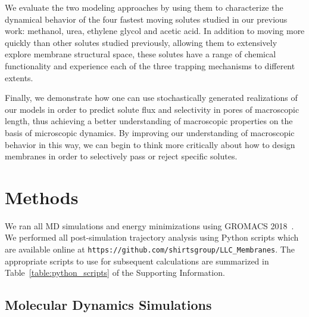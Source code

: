 \documentclass[journal=ancac3,manuscript=article,layout=twocolumn]{achemso}
\begin{document}
  We evaluate the two modeling approaches by using them to characterize the
  dynamical behavior of the four fastest moving solutes studied in our previous
  work: methanol, urea, ethylene glycol and acetic acid. In addition to moving
  more quickly than other solutes studied previously, allowing them to extensively
  explore membrane structural space, these solutes have a range of chemical 
  functionality and experience each of the three trapping mechanisms to different extents.
  
  
  Finally, we demonstrate how one can use stochastically generated realizations
  of our models in order to predict solute flux and selectivity in pores of 
  macroscopic length, thus achieving a better understanding of macroscopic 
  properties on the basis of microscopic dynamics. By improving our 
  understanding of macroscopic behavior in this way, we can begin to think more
  critically about how to design membranes in order to selectively pass or 
  reject specific solutes.
    
  \section{Methods}
    
  We ran all MD simulations and energy minimizations using GROMACS
  2018~\cite{bekker_gromacs:_1993,berendsen_gromacs:_1995,van_der_spoel_gromacs:_2005,hess_gromacs_2008}.
  We performed all post-simulation trajectory analysis using Python scripts
  which are available online at
  \texttt{https://github.com/shirtsgroup/LLC\_Membranes}.  The appropriate
  scripts to use for subsequent calculations are summarized in
  Table~\ref{table:python_scripts} of the Supporting Information.
  
  \subsection{Molecular Dynamics Simulations}
\end{document}
